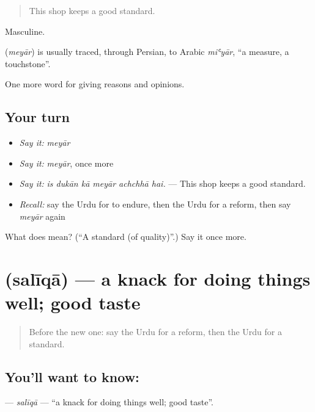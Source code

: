 \begin{quote}
This shop keeps a good standard.
\end{quote}

Masculine.

\begin{cousinweb}
\textbf{} (\emph{meyār}) is usually traced, through Persian, to Arabic \emph{miʿyār}, \textquotedblleft{}a measure, a touchstone\textquotedblright{}.
\end{cousinweb}

\begin{grammarlens}[title={What you've built}]
One more word for giving reasons and opinions.
\end{grammarlens}

\subsection*{Your turn}
\begin{itemize}
\raggedright
  \item \emph{Say it:} \emph{meyār}
  \item \emph{Say it:} \emph{meyār}, once more
  \item \emph{Say it:} \emph{is dukān kā meyār achchhā hai.} — This shop keeps a good standard.
  \item \emph{Recall:} say the Urdu for to endure, then the Urdu for a reform, then say \emph{meyār} again
\end{itemize}

\begin{tcolorbox}[breakable,colback=teal!4,colframe=teal!35!black,title={Before you move on}]
What does  mean? (\textquotedblleft{}A standard (of quality)\textquotedblright{}.) Say it once more.
\end{tcolorbox}
\section[\texorpdfstring{\ur{سلیقہ} (salīqā)}{سلیقہ (salīqā)}]{ (salīqā) — a knack for doing things well; good taste}

\label{lesson:UR-C356-saliqa}



\begin{quote}
Before the new one: say the Urdu for a reform, then the Urdu for a standard.
\end{quote}

\subsection*{You'll want to know: }
\textbf{} — \emph{salīqā} — \textquotedblleft{}a knack for doing things well; good taste\textquotedblright{}.

